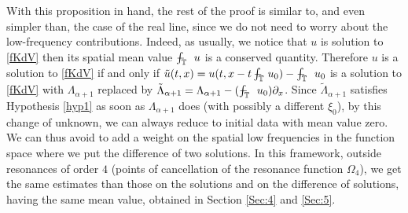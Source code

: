 \documentclass{amsart}
\theoremstyle{definition}
\theoremstyle{remark}
\newcommand{\T}{\mathbb{T}}
\numberwithin{equation}{section}
\begin{document}
With this proposition in hand, the rest of the proof is similar to, and even simpler than, the case of the real line, since we do not need to worry about the low-frequency contributions. Indeed, as usually, we  notice that $ u $ is solution to \eqref{fKdV}  then its spatial mean value $ \int_{\T}\hspace*{-4mm} - \, u $ is a conserved quantity. Therefore $ u$ is a solution to \eqref{fKdV} if and only if $ \tilde{u}(t,x)=u(t,x- t \int_{\T}\hspace*{-4mm} - \,  u_0) - \int_{\T}\hspace*{-4mm} - \,  u_0  $ is a solution to  \eqref{fKdV}  with $ \Lambda_{\alpha+1} $ replaced by $ \tilde{\Lambda}_{\alpha+1}= \Lambda_{\alpha+1} -(\int_{\T}\hspace*{-4mm} - \, u_0) \partial_x $. Since $ \tilde{\Lambda}_{\alpha+1} $ satisfies Hypothesis \ref{hyp1} as soon as $\Lambda_{\alpha+1} $ does (with possibly a different $ \xi_0$), by this change of unknown, we can always reduce to initial data with mean value zero. We can thus avoid  to add a weight on the spatial low frequencies in the function space where we put the difference of two solutions. In this framework, outside resonances of order $ 4$ (points of cancellation of the resonance function $\Omega_4 $), we get the same estimates than those on the solutions and on the difference of solutions, having the same mean value,   obtained in Section \ref{Sec:4} and \ref{Sec:5}. 
\end{document}
